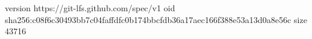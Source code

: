 version https://git-lfs.github.com/spec/v1
oid sha256:c08f6c30493bb7c04faffdfc0b174bbcfdb36a17aec166f388e53a13d0a8e56c
size 43716
